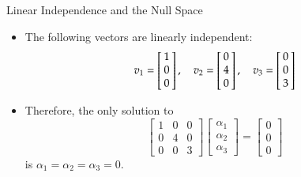 \documentclass[10pt]{beamer}
\begin{document}
\begin{frame}{Linear Independence and the Null Space}

\begin{itemize}
\item The following vectors are linearly independent:
    $$
    v_1=\left[\negthickspace\begin{array}{r}  1 \\ 0 \\  0 \end{array}\negthickspace\right],\quad
    v_2 = \left[\negthickspace\begin{array}{r}  0 \\  4 \\  0 \end{array}\negthickspace\right],\quad
    v_3=\left[\negthickspace\begin{array}{r}  0 \\ 0 \\  3 \end{array}\negthickspace\right]
    $$
\item Therefore, the only solution to
    $$
    \begin{bmatrix}
        1 & 0 & 0 \\
        0 & 4 & 0 \\
        0 & 0 & 3
    \end{bmatrix}\begin{bmatrix}
        \alpha_1 \\ \alpha_2 \\ \alpha_3 
    \end{bmatrix} = \begin{bmatrix}
        0\\0\\0
    \end{bmatrix}
    $$
is $\alpha_1=\alpha_2=\alpha_3=0$.
\end{itemize}
\end{frame}
\end{document}
